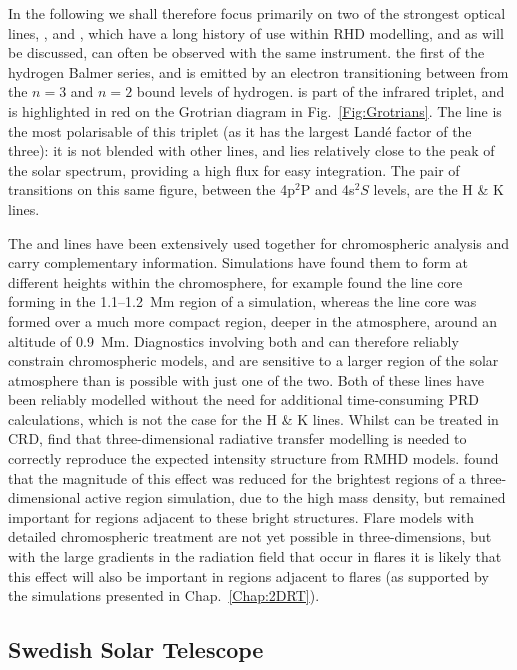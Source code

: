In the following we shall therefore focus primarily on two of the strongest optical lines, \Ha{}, and \CaLine{}, which have a long history of use within RHD modelling, and as will be discussed, can often be observed with the same instrument.
\Ha{} the first of the hydrogen Balmer series, and is emitted by an electron transitioning between from the $n=3$ and $n=2$ bound levels of hydrogen.
\CaLine{} is part of the \Caii{} infrared triplet, and is highlighted in red on the Grotrian diagram in Fig.~\ref{Fig:Grotrians}.
The \CaLine{} line is the most polarisable of this triplet (as it has the largest Landé factor of the three): it is not blended with other lines, and lies relatively close to the peak of the solar spectrum, providing a high flux for easy integration.
The pair of transitions on this same figure, between the 4p$^2$P and 4s$^2S$ levels, are the \Caii{} H \& K lines.

The \Ha{} and \CaLine{} lines have been extensively used together for chromospheric analysis and carry complementary information.
Simulations have found them to form at different heights within the chromosphere, for example \citet{Kuridze2015} found the \Ha{} line core forming in the 1.1--\SI{1.2}{\mega\metre} region of a \Radyn{} simulation, whereas the \CaLine{} line core was formed over a much more compact region, deeper in the atmosphere, around an altitude of \SI{0.9}{\mega\m}.
Diagnostics involving both \Ha{} and \CaLine{} can therefore reliably constrain chromospheric models, and are sensitive to a larger region of the solar atmosphere than is possible with just one of the two.
Both of these lines have been reliably modelled without the need for additional time-consuming PRD calculations, which is not the case for the \Caii{} H \& K lines.
Whilst \Ha{} can be treated in CRD, \citet{Leenaarts2012a} find that three-dimensional radiative transfer modelling is needed to correctly reproduce the expected intensity structure from RMHD models.
\citet{Bjorgen2019} found that the magnitude of this effect was reduced for the brightest regions of a three-dimensional active region simulation, due to the high mass density, but remained important for regions adjacent to these bright structures.
Flare models with detailed chromospheric treatment are not yet possible in three-dimensions, but with the large gradients in the radiation field that occur in flares it is likely that this effect will also be important in regions adjacent to flares (as supported by the simulations presented in Chap.~\ref{Chap:2DRT}).


\subsection{Swedish Solar Telescope}\label{Sec:CRISP}

